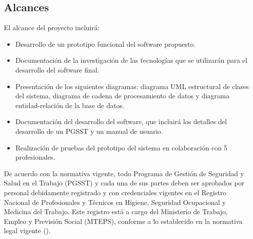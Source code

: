 \subsection{Alcances}

\noindent
El alcance del proyecto incluirá:

\begin{itemize}[topsep=0pt]
	\item Desarrollo de un prototipo funcional del software propuesto.
	\item Documentación de la investigación de las tecnologías que se utilizarán para el desarrollo del software final.
	\item Presentación de los siguientes diagramas: diagrama UML estructural de clases del sistema, diagrama de cadena de procesamiento de datos y diagrama entidad-relación de la base de datos.
	\item Documentación del desarrollo del software, que incluirá los detalles del desarrollo de un PGSST y un manual de usuario.
	\item Realización de pruebas del prototipo del sistema en colaboración con 5 profesionales.
\end{itemize}

De acuerdo con la normativa vigente, todo Programa de Gestión de Seguridad y Salud en el Trabajo (PGSST) y cada una de sus partes deben ser aprobados por personal debidamente registrado y con credenciales vigentes en el Registro Nacional de Profesionales y Técnicos en Higiene, Seguridad Ocupacional y Medicina del Trabajo. Este registro está a cargo del Ministerio de Trabajo, Empleo y Previsión Social (MTEPS), conforme a lo establecido en la normativa legal vigente (\cite{NTS-009/23}).